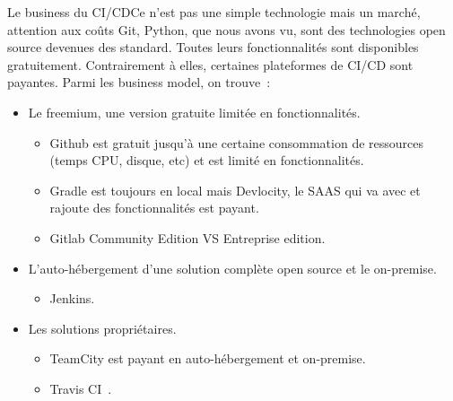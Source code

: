 \documentclass{beamer}
\begin{document}
    \begin{frame}{Le business du CI/CD}{Ce n'est pas une simple technologie mais un marché, attention aux coûts}
        \transdissolve
        Git, Python, que nous avons vu, sont des technologies open source devenues des standard.
        Toutes leurs fonctionnalités sont disponibles gratuitement.
        Contrairement à elles, certaines plateformes de CI/CD sont payantes.
        \bigbreak
        Parmi les business model, on trouve~:
        \begin{itemize}
            \item Le freemium, une version gratuite limitée en fonctionnalités.
            \begin{itemize}
                \item Github est gratuit jusqu'à une certaine consommation de ressources (temps CPU, disque, etc) et est limité en fonctionnalités.
                \item Gradle est toujours  en local mais Devlocity, le SAAS qui va avec et rajoute des fonctionnalités est payant.
                \item Gitlab Community Edition VS Entreprise edition.
            \end{itemize}
            \item L'auto-hébergement d'une solution complète open source et le on-premise.
            \begin{itemize}
                \item Jenkins.
            \end{itemize}
            \item Les solutions propriétaires.
            \begin{itemize}
                \item TeamCity est payant en auto-hébergement et on-premise.
                \item Travis CI~.
            \end{itemize}
        \end{itemize}
    \end{frame}
\end{document}

